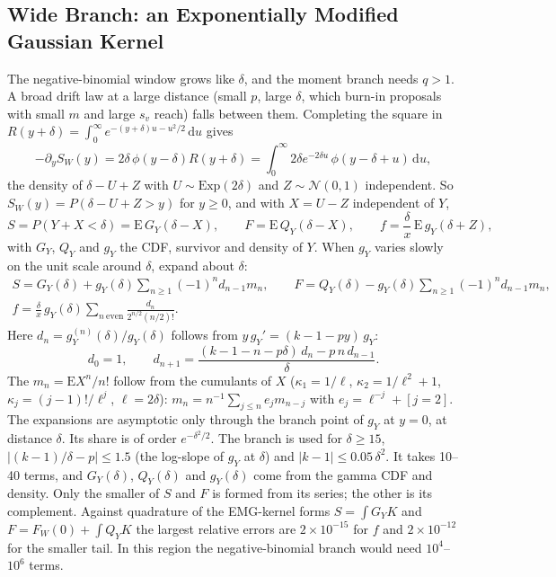 \documentclass[12pt]{article}
\newcommand{\dd}{\,\mathrm{d}}
\newcommand{\Normal}{\mathcal{N}}
\newcommand{\phiN}{\phi}
\begin{document}
\subsection{Wide Branch: an Exponentially Modified Gaussian Kernel}
The negative-binomial window grows like $\delta$, and the moment branch needs $q>1$. A broad drift law at a large distance (small $p$, large $\delta$, which burn-in proposals with small $m$ and large $s_v$ reach) falls between them. Completing the square in $R(y+\delta)=\int_0^\infty e^{-(y+\delta)u-u^2/2}\dd u$ gives
\begin{equation}
  -\partial_yS_W(y)=2\delta\,\phiN(y-\delta)R(y+\delta)
  =\int_0^\infty2\delta e^{-2\delta u}\,\phiN(y-\delta+u)\dd u,
\end{equation}
the density of $\delta-U+Z$ with $U\sim\mathrm{Exp}(2\delta)$ and $Z\sim\Normal(0,1)$ independent. So $S_W(y)=P(\delta-U+Z>y)$ for $y\ge0$, and with $X=U-Z$ independent of $Y$,
\begin{equation}
  S=P(Y+X<\delta)=\mathrm E\,G_Y(\delta-X),\qquad
  F=\mathrm E\,Q_Y(\delta-X),\qquad
  f=\frac\delta x\,\mathrm E\,g_Y(\delta+Z),
\end{equation}
with $G_Y$, $Q_Y$ and $g_Y$ the CDF, survivor and density of $Y$. When $g_Y$ varies slowly on the unit scale around $\delta$, expand about $\delta$:
\begin{gather*}
  S=G_Y(\delta)+g_Y(\delta)\sum_{n\ge1}(-1)^nd_{n-1}m_n,\qquad
  F=Q_Y(\delta)-g_Y(\delta)\sum_{n\ge1}(-1)^nd_{n-1}m_n,\\
  f=\frac\delta x\,g_Y(\delta)\sum_{n\ \mathrm{even}}\frac{d_n}{2^{n/2}(n/2)!}.
\end{gather*}
Here $d_n=g_Y^{(n)}(\delta)/g_Y(\delta)$ follows from $y\,g_Y'=(k-1-py)\,g_Y$:
\begin{equation}
  d_0=1,\qquad
  d_{n+1}=\frac{(k-1-n-p\delta)\,d_n-p\,n\,d_{n-1}}{\delta}.
\end{equation}
The $m_n=\mathrm EX^n/n!$ follow from the cumulants of $X$ ($\kappa_1=1/\ell$, $\kappa_2=1/\ell^2+1$, $\kappa_j=(j-1)!/\ell^j$, $\ell=2\delta$): $m_n=n^{-1}\sum_{j\le n}e_jm_{n-j}$ with $e_j=\ell^{-j}+[j=2]$. The expansions are asymptotic only through the branch point of $g_Y$ at $y=0$, at distance $\delta$. Its share is of order $e^{-\delta^2/2}$. The branch is used for $\delta\ge15$, $|(k-1)/\delta-p|\le1.5$ (the log-slope of $g_Y$ at $\delta$) and $|k-1|\le0.05\,\delta^2$. It takes 10--40 terms, and $G_Y(\delta)$, $Q_Y(\delta)$ and $g_Y(\delta)$ come from the gamma CDF and density. Only the smaller of $S$ and $F$ is formed from its series; the other is its complement. Against quadrature of the EMG-kernel forms $S=\int G_YK$ and $F=F_W(0)+\int Q_YK$ the largest relative errors are $2\times10^{-15}$ for $f$ and $2\times10^{-12}$ for the smaller tail. In this region the negative-binomial branch would need $10^4$--$10^6$ terms.
\end{document}
